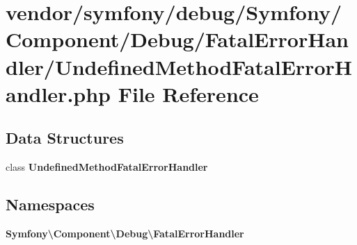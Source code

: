\section{vendor/symfony/debug/\+Symfony/\+Component/\+Debug/\+Fatal\+Error\+Handler/\+Undefined\+Method\+Fatal\+Error\+Handler.php File Reference}
\label{_undefined_method_fatal_error_handler_8php}
\subsection*{Data Structures}
\begin{DoxyCompactItemize}
\item 
class {\bf Undefined\+Method\+Fatal\+Error\+Handler}
\end{DoxyCompactItemize}
\subsection*{Namespaces}
\begin{DoxyCompactItemize}
\item 
 {\bf Symfony\textbackslash{}\+Component\textbackslash{}\+Debug\textbackslash{}\+Fatal\+Error\+Handler}
\end{DoxyCompactItemize}
